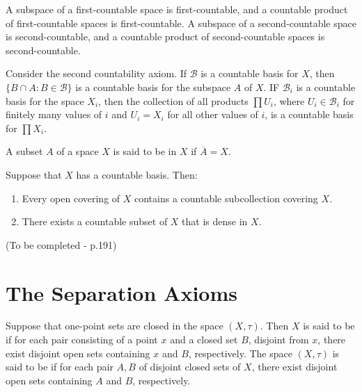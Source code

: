 \documentclass[12pt, a4paper, twoside, openright, titlepage]{book}
\begin{document}
\begin{thm}{}{}
    A subspace of a first-countable space is first-countable, and a countable product of first-countable spaces is first-countable. A subspace of a second-countable space is second-countable, and a countable product of second-countable spaces is second-countable.
\end{thm}
\begin{proof*}{}{}
    Consider the second countability axiom. If $\mathcal{B}$ is a countable basis for $X$, then $\{B\cap A:B\in\mathcal{B}\}$ is a countable basis for the subspace $A$ of $X$. IF $\mathcal{B}_i$ is a countable basis for the space $X_i$, then the collection of all products $\prod U_i$, where $U_i \in \mathcal{B}_i$ for finitely many values of $i$ and $U_i = X_i$ for all other values of $i$, is a countable basis for $\prod X_i$.
\end{proof*}


\begin{defn}{}{}
    A subset $A$ of a space $X$ is said to be  in $X$ if $\overline{A} = X$.
\end{defn}

\begin{thm}{}{}
    Suppose that $X$ has a countable basis. Then: \begin{enumerate}
        \item Every open covering of $X$ contains a countable subcollection covering $X$.
        \item There exists a countable subset of $X$ that is dense in $X$.
    \end{enumerate}
\end{thm}
\begin{proof*}{}{}
    (To be completed - p.191)
\end{proof*}

\section{The Separation Axioms}

\begin{defn}{}{}
    Suppose that one-point sets are closed in the space $(X,\tau)$. Then $X$ is said to be  if for each pair consisting of a point $x$ and a closed set $B$, disjoint from $x$, there exist disjoint open sets containing $x$ and $B$, respectively. The space $(X,\tau)$ is said to be  if for each pair $A,B$ of disjoint closed sets of $X$, there exist disjoint open sets containing $A$ and $B$, respectively.
\end{defn}
\end{document}
